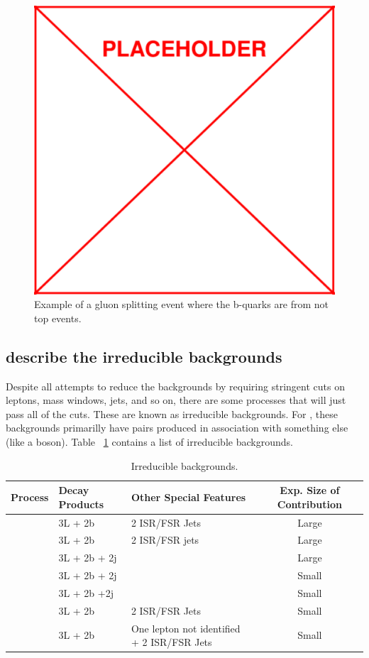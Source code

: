 			\begin{figure}[h]
\begin{center}
\includegraphics[width=0.48\linewidth]{Figs/placeholder.pdf}
\caption{\label{fig:gluon_splitting}
Example of a gluon splitting event where the b-quarks are from not top events.
}
\end{center}
\end{figure} 

		
        		\subsection{describe the irreducible backgrounds} 
	Despite all attempts to reduce the backgrounds by requiring stringent cuts on leptons, mass windows, jets, and so on, there are some processes that will just pass all of the cuts. These are known as irreducible backgrounds. For \ttZ, these backgrounds primarilly have \ttbar pairs produced in association with something else (like a boson). Table ~\ref{tab:irreducible_bkg} contains a list of irreducible backgrounds.
	\begin{table}[hbt]
	\begin{center}
	\begin{tabular}{l|ll|c}\hline\hline %
	Process & Decay Products & Other Special Features & Exp. Size of Contribution\\
	\hline
	\ttW & 3L + 2b& 2 ISR/FSR Jets& Large\\
	\tbZ & 3L + 2b& 2 ISR/FSR jets & Large\\
	\ttH & 3L + 2b + 2j & & Large \\
	\ttG & 3L + 2b + 2j & & Small \\
	\ttWW & 3L + 2b +2j& & Small\\
	\WZZ & 3L + 2b & 2 ISR/FSR Jets & Small\\
	\ZZZ & 3L + 2b & One lepton not identified + 2 ISR/FSR Jets & Small\\
	
	\hline \hline
	\end{tabular}
	\caption{\label{tab:irreducible_bkg} Irreducible backgrounds.}
	\end{center}
	\end{table}
			  
